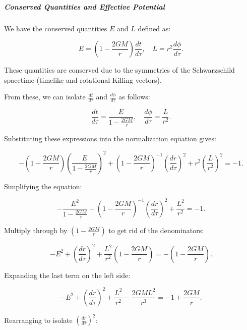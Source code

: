 \subparagraph{Conserved Quantities and Effective Potential}

We have the conserved quantities \(E\) and \(L\) defined as:

\begin{equation}
E = \left(1 - \frac{2GM}{r}\right) \frac{dt}{d\tau},
\quad
L = r^2 \frac{d\phi}{d\tau}.
\end{equation}

These quantities are conserved due to the symmetries of the Schwarzschild spacetime (timelike and rotational Killing vectors).

From these, we can isolate \(\frac{dt}{d\tau}\) and \(\frac{d\phi}{d\tau}\) as follows:

\begin{equation}
\frac{dt}{d\tau} = \frac{E}{1 - \frac{2GM}{r}},
\quad
\frac{d\phi}{d\tau} = \frac{L}{r^2}.
\end{equation}

Substituting these expressions into the normalization equation gives:

\begin{equation}
-\left(1 - \frac{2GM}{r}\right) \left( \frac{E}{1-\frac{2GM}{r}} \right)^2 + \left( 1- \frac{2GM}{r} \right)^{-1} \left( \frac{dr}{d\tau} \right)^2 + r^2 \left( \frac{L}{r^2} \right)^2 = -1.
\end{equation}

Simplifying the equation:

\begin{equation}
-\frac{E^2}{1-\frac{2GM}{r}} + \left( 1- \frac{2GM}{r} \right)^{-1} \left( \frac{dr}{d\tau} \right)^2 + \frac{L^2}{r^2} = -1.
\end{equation}

Multiply through by $\left( 1- \frac{2GM}{r} \right)$ to get rid of the denominators:

\begin{equation}
-E^2 + \left( \frac{dr}{d\tau} \right)^2 + \frac{L^2}{r^2}\left( 1- \frac{2GM}{r} \right) = -\left( 1 - \frac{2GM}{r} \right).
\end{equation}

Expanding the last term on the left side:

\begin{equation}
-E^2 + \left( \frac{dr}{d\tau} \right)^2 + \frac{L^2}{r^2} - \frac{2GML^2}{r^3} = -1 + \frac{2GM}{r}.
\end{equation}

Rearranging to isolate $\left( \frac{dr}{d\tau} \right)^2$:

